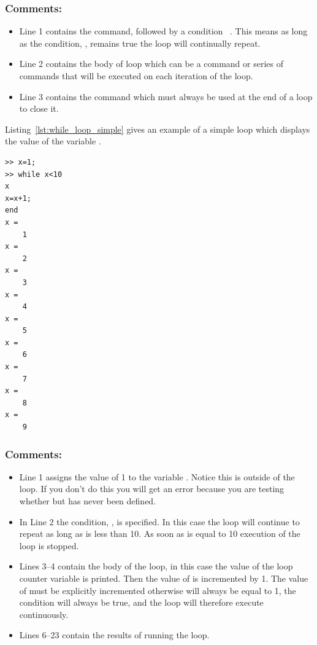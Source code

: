 \subsubsection{Comments:}
\begin{itemize}
\item Line 1 contains the  command, followed by a condition \eg\ . This means as long as the condition, , remains true the loop will continually repeat.
\item Line 2 contains the body of loop which can be a command or series of commands that will be executed on each iteration of the loop.
\item Line 3 contains the  command which must always be used at the end of a loop to close it.
\end{itemize}

Listing~\ref{lst:while_loop_simple} gives an example of a simple  loop which displays the value of the variable .
\begin{lstlisting}[caption={Simple example of a \mcode{while} loop},label=lst:while_loop_simple]
>> x=1;
>> while x<10
x
x=x+1;
end
x =
    1
x =
    2
x =
    3
x =
    4
x =
    5
x =
    6
x =
    7
x =
    8
x =
    9	
\end{lstlisting}

\subsubsection{Comments:}
\begin{itemize}
\item Line 1 assigns the value of 1 to the variable . Notice this is outside of the  loop. If you don't do this you will get an error because you are testing whether  but  has never been defined. 
\item In Line 2 the condition, , is specified. In this case the loop will continue to repeat as long as  is less than 10. As soon as  is equal to 10 execution of the loop is stopped.
\item Lines 3--4 contain the body of the loop, in this case the value of the loop counter variable  is printed. Then the value of  is incremented by 1. The value of  must be explicitly incremented otherwise  will always be equal to 1, the condition  will always be true, and the loop will therefore execute continuously.
\item Lines 6--23 contain the results of running the  loop.
\end{itemize}

